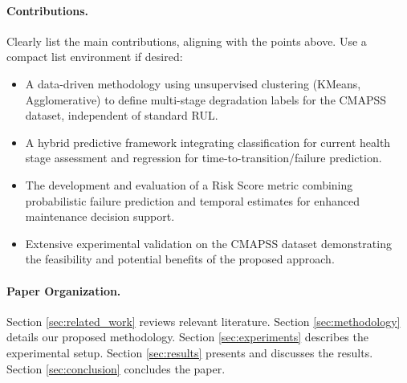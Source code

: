 \paragraph{Contributions.}
Clearly list the main contributions, aligning with the points above. Use a compact list environment if desired:
\begin{itemize}
	\item A data-driven methodology using unsupervised clustering (KMeans, Agglomerative) to define multi-stage degradation labels for the CMAPSS dataset, independent of standard RUL.
	\item A hybrid predictive framework integrating classification for current health stage assessment and regression for time-to-transition/failure prediction.
	\item The development and evaluation of a Risk Score metric combining probabilistic failure prediction and temporal estimates for enhanced maintenance decision support.
	\item Extensive experimental validation on the CMAPSS dataset demonstrating the feasibility and potential benefits of the proposed approach.
\end{itemize}

\paragraph{Paper Organization.}
Section \cref{sec:related_work} reviews relevant literature. Section \cref{sec:methodology} details our proposed methodology. Section \cref{sec:experiments} describes the experimental setup. Section \cref{sec:results} presents and discusses the results. Section \cref{sec:conclusion} concludes the paper.


